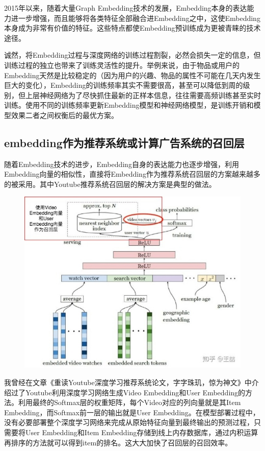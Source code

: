 \documentclass[12pt]{article}
\begin{document}
2015年以来，随着大量Graph Embedding技术的发展，Embedding本身的表达能力进一步增强，而且能够将各类特征全部融合进Embedding之中，这使Embedding本身成为非常有价值的特征。这些特点都使Embedding预训练成为更被青睐的技术途径。

诚然，将Embedding过程与深度网络的训练过程割裂，必然会损失一定的信息，但训练过程的独立也带来了训练灵活性的提升。举例来说，由于物品或用户的Embedding天然是比较稳定的（因为用户的兴趣、物品的属性不可能在几天内发生巨大的变化），Embedding的训练频率其实不需要很高，甚至可以降低到周的级别，但上层神经网络为了尽快抓住最新的正样本信息，往往需要高频训练甚至实时训练。使用不同的训练频率更新Embedding模型和神经网络模型，是训练开销和模型效果二者之间权衡后的最优方案。

\subsection{embedding作为推荐系统或计算广告系统的召回层}
随着Embedding技术的进步，Embedding自身的表达能力也逐步增强，利用Embedding向量的相似性，直接将Embedding作为推荐系统召回层的方案越来越多的被采用。其中Youtube推荐系统召回层的解决方案是典型的做法。
\begin{figure}[H]
    \centering
    \includegraphics[width=1\textwidth]{fig/Embedding_In_Youtube.jpg}
\end{figure}

我曾经在文章《重读Youtube深度学习推荐系统论文，字字珠玑，惊为神文》中介绍过了Youtube利用深度学习网络生成Video Embedding和User Embedding的方法。利用最终的Softmax层的权重矩阵，每个Video对应的列向量就是其Item Embedding，而Softmax前一层的输出就是User Embedding。在模型部署过程中，没有必要部署整个深度学习网络来完成从原始特征向量到最终输出的预测过程，只需要将User Embedding和Item Embedding存储到线上内存数据库，通过内积运算再排序的方法就可以得到item的排名。这大大加快了召回层的召回效率。
\end{document}
